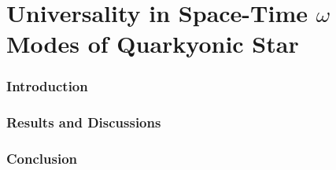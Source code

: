 \chapter{Universality in Space-Time $\omega$ Modes of Quarkyonic Star }
\label{C6} 
\subsection{Introduction}
\subsection{Results and Discussions}
\subsection{Conclusion}
